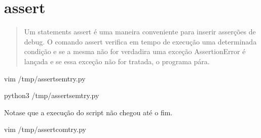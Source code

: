 \documentclass[letterpaper,10pt,brazil]{sphinxmanual}
\begin{document}
\section{assert}
\label{\detokenize{content/built-ins:assert}}\begin{quote}

Um statements assert é uma maneira conveniente para inserir asserções de debug.
O comando assert verifica em tempo de execução uma determinada condição e se a mesma não for verdadira uma exceção AssertionError é lançada e se essa exceção não for tratada, o programa pára.
\end{quote}

\begin{sphinxVerbatim}[commandchars=\\\{\}]
vim /tmp/assert\PYGZus{}sem\PYGZus{}try.py
\end{sphinxVerbatim}

\begin{sphinxVerbatim}[commandchars=\\\{\},numbers=left,firstnumber=1,stepnumber=1]

     
     

\end{sphinxVerbatim}

\begin{sphinxVerbatim}[commandchars=\\\{\}]
\PYGZdl{} python3 /tmp/assert\PYGZus{}sem\PYGZus{}try.py
\end{sphinxVerbatim}

\begin{sphinxVerbatim}[commandchars=\\\{\}]
\end{sphinxVerbatim}

Nota\sphinxhyphen{}se que a execução do script não chegou até o fim.

\begin{sphinxVerbatim}[commandchars=\\\{\}]
\PYGZdl{} 
vim /tmp/assert\PYGZus{}com\PYGZus{}try.py
\end{sphinxVerbatim}
\end{document}
